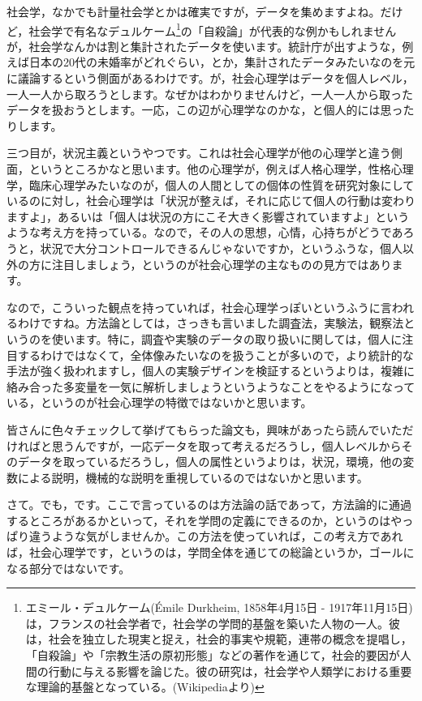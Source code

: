 \documentclass{ltjsbook}
\begin{document}
社会学，なかでも計量社会学とかは確実ですが，データを集めますよね。だけど，社会学で有名なデュルケーム\footnote{エミール・デュルケーム(Émile Durkheim, 1858年4月15日 - 1917年11月15日)は，フランスの社会学者で，社会学の学問的基盤を築いた人物の一人。彼は，社会を独立した現実と捉え，社会的事実や規範，連帯の概念を提唱し，「自殺論」や「宗教生活の原初形態」などの著作を通じて，社会的要因が人間の行動に与える影響を論じた。彼の研究は，社会学や人類学における重要な理論的基盤となっている。(Wikipediaより)}の「自殺論」\parencite{SPjisaturon}が代表的な例かもしれませんが，社会学なんかは割と集計されたデータを使います。統計庁が出すような，例えば日本の20代の未婚率がどれぐらい，とか，集計されたデータみたいなのを元に議論するという側面があるわけです。が，社会心理学はデータを個人レベル，一人一人から取ろうとします。なぜかはわかりませんけど，一人一人から取ったデータを扱おうとします。一応，この辺が心理学なのかな，と個人的には思ったりします。

三つ目が，状況主義というやつです。これは社会心理学が他の心理学と違う側面，というところかなと思います。他の心理学が，例えば人格心理学，性格心理学，臨床心理学みたいなのが，個人の人間としての個体の性質を研究対象にしているのに対し，社会心理学は「状況が整えば，それに応じて個人の行動は変わりますよ」，あるいは「個人は状況の方にこそ大きく影響されていますよ」というような考え方を持っている。なので，その人の思想，心情，心持ちがどうであろうと，状況で大分コントロールできるんじゃないですか，というふうな，個人以外の方に注目しましょう，というのが社会心理学の主なものの見方ではあります。

なので，こういった観点を持っていれば，社会心理学っぽいというふうに言われるわけですね。方法論としては，さっきも言いました調査法，実験法，観察法というのを使います。特に，調査や実験のデータの取り扱いに関しては，個人に注目するわけではなくて，全体像みたいなのを扱うことが多いので，より統計的な手法が強く扱われますし，個人の実験デザインを検証するというよりは，複雑に絡み合った多変量を一気に解析しましょうというようなことをやるようになっている，というのが社会心理学の特徴ではないかと思います。

皆さんに色々チェックして挙げてもらった論文も，興味があったら読んでいただければと思うんですが，一応データを取って考えるだろうし，個人レベルからそのデータを取っているだろうし，個人の属性というよりは，状況，環境，他の変数による説明，機械的な説明を重視しているのではないかと思います。

さて。でも，です。ここで言っているのは方法論の話であって，方法論的に通過するところがあるかといって，それを学問の定義にできるのか，というのはやっぱり違うような気がしませんか。この方法を使っていれば，この考え方であれば，社会心理学です，というのは，学問全体を通じての総論というか，ゴールになる部分ではないです。
\end{document}
